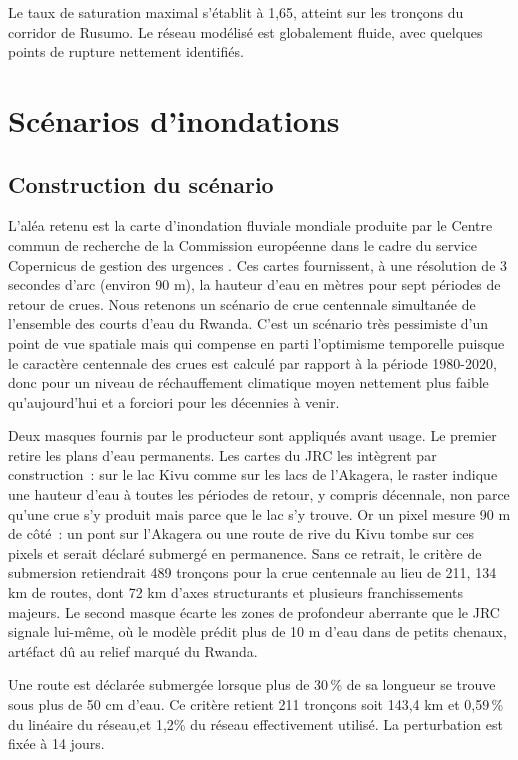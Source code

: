 \documentclass[12pt,a4paper,french]{report}
\begin{document}
	Le taux de saturation maximal s'établit à 1,65, atteint sur les tronçons du corridor de Rusumo. Le réseau modélisé est globalement fluide, avec quelques points de rupture nettement identifiés. 
	
	\section{Scénarios d'inondations}
	\label{sec:scenario}
	
	\subsection{Construction du scénario}

	L'aléa retenu est la carte d'inondation fluviale mondiale produite par le Centre commun de recherche de la Commission européenne dans le cadre du service Copernicus de gestion des urgences \parencite{Baugh2024}. Ces cartes fournissent, à une résolution de 3 secondes d'arc (environ 90 m), la hauteur d'eau en mètres pour sept périodes de retour de crues. Nous retenons un scénario de crue centennale simultanée de l'ensemble des courts d'eau du Rwanda. C'est un scénario très pessimiste d'un point de vue spatiale mais qui compense en parti l'optimisme temporelle puisque le caractère centennale des crues est calculé par rapport à la période 1980-2020, donc pour un niveau de réchauffement climatique moyen nettement plus faible qu'aujourd'hui et a forciori pour les décennies à venir.

	Deux masques fournis par le producteur sont appliqués avant usage. Le premier retire les plans d'eau permanents. Les cartes du JRC les intègrent par construction~: sur le lac Kivu comme sur les lacs de l'Akagera, le raster indique une hauteur d'eau à toutes les périodes de retour, y compris décennale, non parce qu'une crue s'y produit mais parce que le lac s'y trouve. Or un pixel mesure 90 m de côté~: un pont sur l'Akagera ou une route de rive du Kivu tombe sur ces pixels et serait déclaré submergé en permanence. Sans ce retrait, le critère de submersion retiendrait 489 tronçons pour la crue centennale au lieu de 211, 134 km de routes, dont 72 km d'axes structurants et plusieurs franchissements majeurs. Le second masque écarte les zones de profondeur aberrante que le JRC signale lui-même, où le modèle prédit plus de 10 m d'eau dans de petits chenaux, artéfact dû au relief marqué du Rwanda.

	Une route est déclarée submergée lorsque plus de 30\,\% de sa longueur se trouve sous plus de 50 cm d'eau. Ce critère retient 211 tronçons soit 143,4 km et 0,59\,\% du linéaire du réseau,et 1,2\% du réseau effectivement utilisé. La perturbation est fixée à 14 jours.
\end{document}
